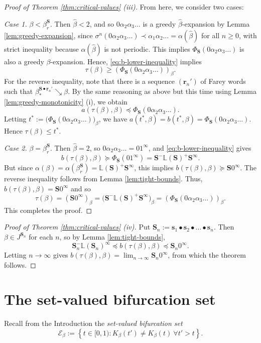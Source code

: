 \documentclass[12pt]{amsart}
\theoremstyle{definition}
\theoremstyle{remark}
\numberwithin{equation}{section}
\renewcommand{\L}{\ensuremath{\mathbb{L}}}
\newcommand{\s}{ {\mathbf{s}}}
\newcommand{\cs}{ {\mathbf{S}}}
\renewcommand{\r}{ {\mathbf{r}}}
\newcommand{\E}{\mathscr{E}}
\newcommand{\set}[1]{\left\{#1\right\}}
\newcommand{\f}{\infty}
\newcommand{\al}{\alpha}
\newcommand{\lle}{\preccurlyeq}
\newcommand{\lge}{\succcurlyeq}
\newcommand{\si}{\sigma}
\begin{document}
{\begin{proof}[Proof of Theorem \ref{thm:critical-values} (iii)]
From here, we consider two cases:

\medskip
{\em Case 1.} $\beta<\beta_r^\cs$. Then $\hat{\beta}<2$, and so $0\al_2\al_3\dots$ is a greedy $\hat{\beta}$-expansion by Lemma \ref{lem:greedy-expansion}, since $\si^n(0\al_2\al_3\dots)\prec\al_1\al_2\dots=\al(\hat{\beta})$ for all $n\geq 0$, with strict inequality because $\al(\hat{\beta})$ is not periodic. This implies $\Phi_\cs(0\al_2\al_3\dots)$ is also a greedy $\beta$-expansion. Hence, \eqref{eq:b-lower-inequality} implies
\[
\tau(\beta)\geq \left(\Phi_\cs(0\al_2\al_3\dots)\right)_\beta.
\]
For the reverse inequality, note that there is a sequence $(\r_n')$ of Farey words such that $\beta_*^{\cs\bullet\r_n'}\searrow\beta$. By the same reasoning as above but this time using Lemma \ref{lem:greedy-monotonicity} (i), we obtain
\[
a(\tau(\beta),\beta)\lle \Phi_\cs(0\al_2\al_3\dots).
\]
Letting $t^*:=\big(\Phi_\cs(0\al_2\al_3\dots)\big)_\beta$, we have $a(t^*,\beta)=b(t^*,\beta)=\Phi_\cs(0\al_2\al_3\dots)$. Hence $\tau(\beta)\leq t^*$.

\medskip
{\em Case 2.} $\beta=\beta_r^\cs$. Then $\hat{\beta}=2$, so $0\al_2\al_3\dots=01^\f$, and \eqref{eq:b-lower-inequality} gives
\[
b(\tau(\beta),\beta)\lge \Phi_\cs(01^\f)=\cs^-\L(\cs)^+\cs^\f.
\]
But since $\al(\beta)=\al(\beta_r^\cs)=\L(\cs)^+\cs^\f$, this implies $b(\tau(\beta),\beta)\lge \cs 0^\f$. The reverse inequality follows from Lemma \ref{lem:tight-bounds}. Thus, $b(\tau(\beta),\beta)=\cs 0^\f$ and so
\[
\tau(\beta)=(\cs 0^\f)_\beta=\big(\cs^-\L(\cs)^+\cs^\f\big)_\beta=\left(\Phi_\cs(0\al_2\al_3\dots)\right)_\beta.
\]
This completes the proof.
\end{proof}

\begin{proof}[Proof of Theorem \ref{thm:critical-values} (iv)]
Put $\cs_n:=\s_1\bullet\s_2\bullet\dots\bullet\s_n$. Then $\beta\in J^{\cs_n}$ for each $n$, so by Lemma \ref{lem:tight-bounds},
\[
\cs_n^-\L(\cs_n)^\f\lle b(\tau(\beta),\beta)\lle \cs_n 0^\f.
\]
Letting $n\to\f$ gives $b(\tau(\beta),\beta)=\lim_{n\to\f}\cs_n 0^\f$, from which the theorem follows.
\end{proof}


\section{The set-valued bifurcation set} \label{sec:bifurcation-set}

Recall from the Introduction the \emph{set-valued bifurcation set}
\begin{equation*} %
\E_\beta:=\set{t\in[0,1): K_\beta(t')\ne K_\beta(t)~\forall t'>t}.
\end{equation*}

}
\end{document}
